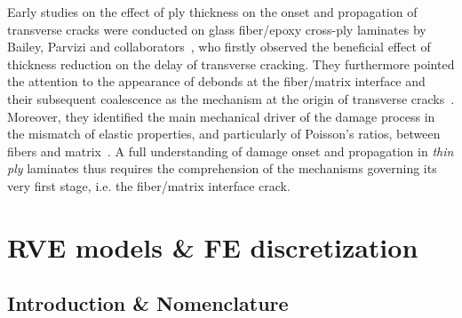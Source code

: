 \documentclass[review]{elsarticle}
\begin{document}
Early studies on the effect of ply thickness on the onset and propagation of transverse cracks were conducted on glass fiber/epoxy cross-ply laminates by Bailey, Parvizi and collaborators~\cite{Garrett1977,Parvizi1978a,Parvizi1978b}, who firstly observed the beneficial effect of thickness reduction on the delay of transverse cracking. They furthermore pointed the attention to the appearance of debonds at the fiber/matrix interface and their subsequent coalescence as the mechanism at the origin of transverse cracks~\cite{Bailey1981}. Moreover, they identified the main mechanical driver of the damage process in the mismatch of elastic properties, and particularly of Poisson's ratios, between fibers and matrix~\cite{Bailey1979}. A full understanding of damage onset and propagation in \emph{thin ply} laminates thus requires the comprehension of the mechanisms governing its very first stage, i.e. the fiber/matrix interface crack. 


\section{RVE models \& FE discretization}

\subsection{Introduction \& Nomenclature}\label{subsec:names}
\end{document}
